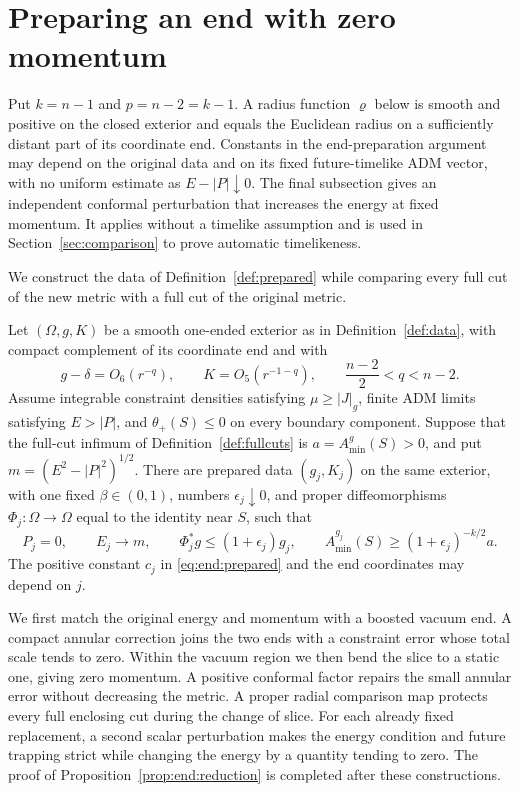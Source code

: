 \section{Preparing an end with zero momentum}\label{sec:end}

Put $k=n-1$ and $p=n-2=k-1$.  A radius function $\varrho$ below
is smooth and positive on the closed exterior and equals the Euclidean
radius on a sufficiently distant part of its coordinate end.  Constants in the end-preparation argument may depend on the
original
data and on its fixed future-timelike ADM vector, with no uniform
estimate as $E-|P|\downarrow0$.  The final subsection gives an
independent conformal perturbation that increases the energy at fixed
momentum.  It applies without a timelike assumption and is used in
Section~\ref{sec:comparison} to prove automatic timelikeness.

We construct the data of Definition~\ref{def:prepared} while comparing
every full cut of the new metric with a full cut of the original metric.

\begin{proposition}
\label{prop:end:reduction}
Let $(\Omega,g,K)$ be a smooth one-ended exterior as in
Definition~\ref{def:data}, with compact complement of its coordinate
end and with
\[
 g-\delta=O_6(r^{-q}),\qquad K=O_5(r^{-1-q}),\qquad
 \frac{n-2}{2}<q<n-2.
\]
Assume integrable constraint densities satisfying $\mu\ge|J|_g$,
finite ADM limits satisfying $E>|P|$, and $\theta_+(S)\le0$ on every
boundary component.  Suppose that the full-cut infimum of
Definition~\ref{def:fullcuts} is $a=A_{\min}^{g}(S)>0$, and put
$m=(E^2-|P|^2)^{1/2}$.
There are prepared data $(g_j,K_j)$ on the same exterior, with one
fixed $\beta\in(0,1)$, numbers $\epsilon_j\downarrow0$, and proper
diffeomorphisms $\Phi_j:\Omega\longrightarrow\Omega$ equal to the
identity near $S$, such that
\begin{equation}\label{eq:end:reduction-limits}
 P_j=0,\qquad E_j\longrightarrow m,\qquad
 \Phi_j^*g\le(1+\epsilon_j)g_j,\qquad
 A_{\min}^{g_j}(S)\ge(1+\epsilon_j)^{-k/2}a.
\end{equation}
The positive constant $c_j$ in \eqref{eq:end:prepared} and
the end coordinates may depend on $j$.
\end{proposition}

We first match the original energy and momentum with a
boosted vacuum end.  A compact annular correction joins the two ends
with a constraint error whose total scale tends to zero.  Within the
vacuum region we then bend the slice to a static one, giving zero
momentum.  A positive conformal factor repairs the small annular
error without decreasing the metric.  A proper radial comparison
map protects every full enclosing cut during the change of slice.
For each already fixed replacement, a second scalar perturbation makes
the energy condition and future trapping strict while changing the energy
by a quantity tending to zero.  The proof of
Proposition~\ref{prop:end:reduction} is completed after these constructions.

